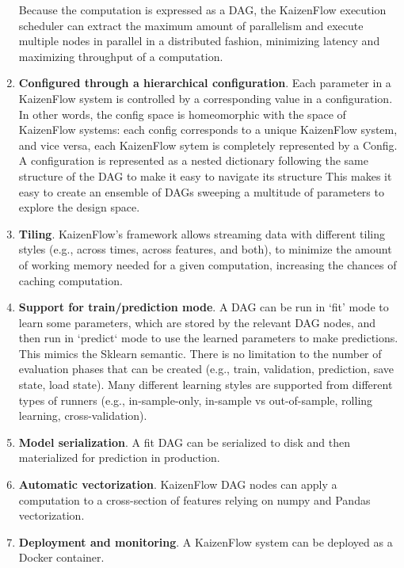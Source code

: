 \documentclass[11pt, reqno]{amsart}
\theoremstyle{definition}
\theoremstyle{remark}
\begin{document}
\begin{enumerate}
        Because the computation is expressed as a DAG, the KaizenFlow
        execution scheduler can extract the maximum amount of parallelism and
        execute multiple nodes in parallel in a distributed fashion,
        minimizing latency and maximizing throughput of a computation.
  \item \textbf{Configured through a hierarchical configuration}.
        Each parameter in a KaizenFlow system is controlled by a
        corresponding value in a configuration.
        In other words, the config space is homeomorphic with the space of
        KaizenFlow systems: each config corresponds to a unique KaizenFlow
        system, and vice versa, each KaizenFlow sytem is completely
        represented by a Config.
        A configuration is represented as a nested dictionary following the
        same structure of the DAG to make it easy to navigate its structure
        This makes it easy to create an ensemble of DAGs sweeping a multitude
        of parameters to explore the design space.
  \item \textbf{Tiling}.
        KaizenFlow's framework allows streaming data with different tiling
        styles (e.g., across times, across features, and both), to minimize
        the amount of working memory needed for a given computation, increasing
        the chances of caching computation.
  \item \textbf{Support for train/prediction mode}.
        A DAG can be run in `fit' mode to learn some parameters, which are
        stored by the relevant DAG nodes, and then run in `predict` mode
        to use the learned parameters to make predictions.
        This mimics the Sklearn semantic.
        There is no limitation to the number of evaluation phases that can be
        created (e.g., train, validation, prediction, save state, load state).
        Many different learning styles are supported from different types of
        runners (e.g., in-sample-only, in-sample vs out-of-sample,
        rolling learning, cross-validation).
  \item \textbf{Model serialization}.
        A fit DAG can be serialized to disk and then materialized for
        prediction in production.
  \item \textbf{Automatic vectorization}.
        KaizenFlow DAG nodes can apply a computation to a cross-section of
        features relying on numpy and Pandas vectorization.
  \item \textbf{Deployment and monitoring}.
        A KaizenFlow system can be deployed as a Docker container.

\end{enumerate}
\end{document}
